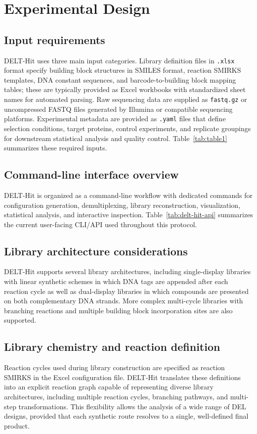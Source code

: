 \section{Experimental Design}

\subsection{Input requirements}
DELT-Hit uses three main input categories. Library definition files in \texttt{.xlsx} format specify building block structures in SMILES format, reaction SMIRKS templates, DNA constant sequences, and barcode-to-building block mapping tables; these are typically provided as Excel workbooks with standardized sheet names for automated parsing. Raw sequencing data are supplied as \texttt{fastq.gz} or uncompressed FASTQ files generated by Illumina or compatible sequencing platforms. Experimental metadata are provided as \texttt{.yaml} files that define selection conditions, target proteins, control experiments, and replicate groupings for downstream statistical analysis and quality control. Table~\ref{tab:table1} summarizes these required inputs.



\subsection{Command-line interface overview}
DELT-Hit is organized as a command-line workflow with dedicated commands for configuration generation, demultiplexing, library reconstruction, visualization, statistical analysis, and interactive inspection. Table~\ref{tab:delt-hit-api} summarizes the current user-facing CLI/API used throughout this protocol.




\subsection{Library architecture considerations}
DELT-Hit supports several library architectures, including single-display libraries with linear synthetic schemes in which DNA tags are appended after each reaction cycle as well as dual-display libraries in which compounds are presented on both complementary DNA strands. More complex multi-cycle libraries with branching reactions and multiple building block incorporation sites are also supported.


\subsection{Library chemistry and reaction definition}
Reaction cycles used during library construction are specified as reaction SMIRKS in the Excel configuration file. DELT-Hit translates these definitions into an explicit reaction graph capable of representing diverse library architectures, including multiple reaction cycles, branching pathways, and multi-step transformations. This flexibility allows the analysis of a wide range of DEL designs, provided that each synthetic route resolves to a single, well-defined final product.

